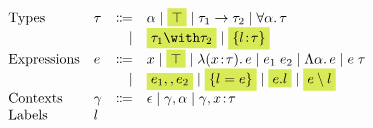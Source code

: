 \[
\begin{array}{l}
  \begin{array}{llrl}
    \text{Types}
    & \tau & \Coloneqq & \alpha \mid \highlight{\top} \mid \tau_1 \to \tau_2 \mid \for \alpha \tau \\
    &      & \mid      & \highlight{\tau_1 \andOp \tau_2} \mid \highlight{\recordType l \tau} \\
    \text{Expressions}
    & e & \Coloneqq & x \mid \highlight{\top} \mid \lam x \tau e \mid \app {e_1} {e_2} \mid \blam \alpha e \mid \tapp e \tau \\
    &   & \mid      & \highlight {e_1 \mergeOp e_2} \mid \highlight {\recordCon l e} \mid
                      \highlight {e.l} \mid \highlight{e \restrictOp l} \\
    \text{Contexts}
    & \gamma & \Coloneqq & \epsilon \mid \gamma, \alpha \mid \gamma, x \hast \tau \\
    \text{Labels} & l
  \end{array}
\end{array}
\]
